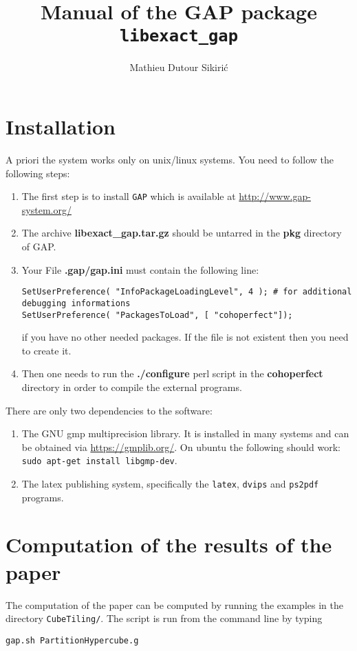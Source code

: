 \documentclass[12pt]{amsart}
\begin{document}
\author{Mathieu Dutour Sikiri\'c}
\address{Mathieu Dutour Sikiri\'c, Rudjer Boskovi\'c Institute, Bijenicka 54, 10000 Zagreb, Croatia}


\title{Manual of the GAP package {\tt libexact\_gap}}
\date{}

\maketitle
\tableofcontents

\section{Installation}

A priori the system works only on unix/linux systems.
You need to follow the following steps:
\begin{enumerate}
\item The first step is to install {\tt GAP} which is available at \url{http://www.gap-system.org/}


\item The archive {\bf libexact\_gap.tar.gz} should be untarred in the {\bf pkg} directory of GAP.

\item Your File {\bf .gap/gap.ini} must contain the following line:
\begin{verbatim}
SetUserPreference( "InfoPackageLoadingLevel", 4 ); # for additional debugging informations
SetUserPreference( "PackagesToLoad", [ "cohoperfect"]);
\end{verbatim}
if you have no other needed packages. If the file is not existent then you need to create it.

\item Then one needs to run the {\bf ./configure} perl script in the {\bf cohoperfect} directory in order to compile the external programs.
\end{enumerate}
There are only two dependencies to the software:
\begin{enumerate}
\item The GNU gmp multiprecision library. It is installed in many systems and can be obtained via \url{https://gmplib.org/}. On ubuntu the following should work: {\tt sudo apt-get install libgmp-dev}.
\item The latex publishing system, specifically the {\tt latex}, {\tt dvips} and {\tt ps2pdf} programs.  
\end{enumerate}


\section{Computation of the results of the paper}

The computation of the paper can be computed by running the examples in the directory {\tt CubeTiling/}.
The script is run from the command line by typing
\begin{verbatim}
gap.sh PartitionHypercube.g
\end{verbatim}
\end{document}

